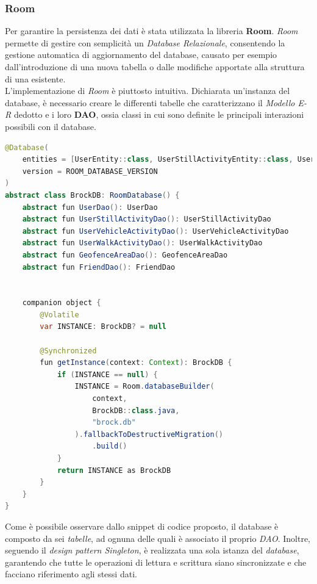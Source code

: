 \documentclass{article}
\begin{document}
\subsubsection*{Room}
Per garantire la persistenza dei dati è stata utilizzata la libreria \textbf{Room}. \textit{Room} permette di gestire con semplicità un \textit{Database Relazionale}, consentendo la gestione automatica di aggiornamento del database, causato per esempio dall'introduzione di una nuova tabella o dalle modifiche apportate alla struttura di una esistente. \vspace*{7pt}\\
L'implementazione di \textit{Room} è piuttosto intuitiva. Dichiarata un'instanza del database, è necessario creare le differenti tabelle che caratterizzano il \textit{Modello E-R} dedotto e i loro \textbf{DAO}, ossia classi in cui sono definite le principali interazioni possibili con il database.
\begin{lstlisting}[language = JAVA]
@Database(
    entities = [UserEntity::class, UserStillActivityEntity::class, UserVehicleActivityEntity::class, UserWalkActivityEntity::class, GeofenceAreaEntry::class, FriendEntity::class],
    version = ROOM_DATABASE_VERSION
)
abstract class BrockDB: RoomDatabase() {
    abstract fun UserDao(): UserDao
    abstract fun UserStillActivityDao(): UserStillActivityDao
    abstract fun UserVehicleActivityDao(): UserVehicleActivityDao
    abstract fun UserWalkActivityDao(): UserWalkActivityDao
    abstract fun GeofenceAreaDao(): GeofenceAreaDao
    abstract fun FriendDao(): FriendDao
    
    
    companion object {
        @Volatile
        var INSTANCE: BrockDB? = null

        @Synchronized
        fun getInstance(context: Context): BrockDB {
            if (INSTANCE == null) {
                INSTANCE = Room.databaseBuilder(
                    context,
                    BrockDB::class.java,
                    "brock.db"
                ).fallbackToDestructiveMigration()
                    .build()
            }
            return INSTANCE as BrockDB
        }
    }
}
\end{lstlisting}
Come è possibile osservare dallo snippet di codice proposto, il database è composto da sei \textit{tabelle}, ad ognuna delle quali è associato il proprio \textit{DAO}.
Inoltre, seguendo il \textit{design pattern Singleton}, è realizzata una sola istanza del \textit{database}, garantendo che tutte le operazioni di lettura e scrittura siano sincronizzate e che facciano riferimento agli stessi dati.
\end{document}
